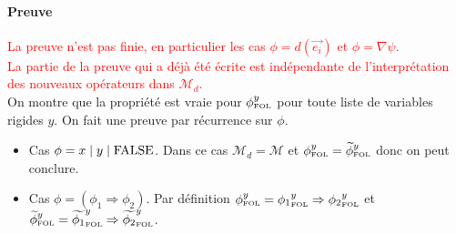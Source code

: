 \documentclass[12pt]{article}
\newcommand{\FOL}{\ensuremath{\textup{\tiny{}FOL}}}
\newcommand{\M}{\ensuremath{\mathcal{M}}}
\newcommand{\raph}[1]{\textcolor{red}{#1}}
\begin{document}
\paragraph{Preuve}
\raph{La preuve n'est pas finie, en particulier les cas $\phi = d(\vec{e_i})$ et $\phi = \nabla \psi$.}\\
\raph{La partie de la preuve qui a déjà été écrite est indépendante de l'interprétation des nouveaux opérateurs dans $\M_d$.}\\
On montre que la propriété est vraie pour $\phi_\FOL^y$ pour toute liste de variables rigides $y$.
On fait une preuve par récurrence sur $\phi$.
\begin{itemize}
\item
  Cas $\phi = x \; | \; y \; | \; \textup{FALSE}$.
  Dans ce cas $\M_d = \M$ et $\phi_\FOL^y = \widetilde{\phi}_\FOL^y$ donc on peut conclure.
\item
  Cas $\phi = (\phi_1 \Rightarrow \phi_2)$.
  Par définition ${\phi}_\FOL^y = {\phi_1}_\FOL^y \Rightarrow {\phi_2}_\FOL^y$ et  $\widetilde{\phi}_\FOL^y = \widetilde{\phi_1}_\FOL^y \Rightarrow \widetilde{\phi_2}_\FOL^y$.





\end{itemize}
\end{document}
